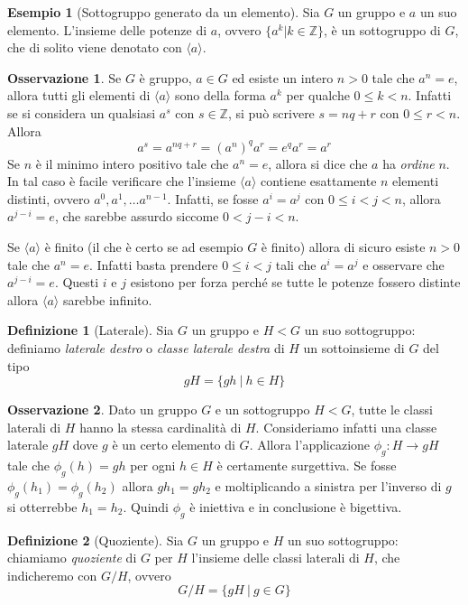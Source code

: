 \documentclass[11pt]{article}
\theoremstyle{plain}
\theoremstyle{definition}
\newtheorem{defn}{Definizione}[section]
\newtheorem{exmp}{Esempio}[section]
\newtheorem*{rem}{Osservazione}
\theoremstyle{remark}
\newcommand{\Z}{\mathbb{Z}}
\begin{document}
\begin{exmp}[Sottogruppo generato da un elemento]
Sia $G$ un gruppo e $a$ un suo elemento. L'insieme delle potenze di $a$, ovvero $\{a^k | k\in\Z\}$, è un sottogruppo di $G$,
che di solito viene denotato con $\langle a\rangle$.
\end{exmp}

\begin{rem}
Se $G$ è gruppo, $a\in G$ ed esiste un intero $n>0$ tale che $a^n=e$, allora tutti gli elementi di $\langle a\rangle$ sono della forma
$a^k$ per qualche $0\le k < n$. Infatti se si considera un qualsiasi $a^s$ con $s\in\Z$, si può scrivere $s=nq+r$ con $0\le r<n$.
Allora \[a^s=a^{nq+r} = (a^n)^qa^r = e^qa^r = a^r\]
Se $n$ è il minimo intero positivo tale che $a^n=e$, allora si dice che $a$ ha \emph{ordine} $n$. In tal caso è facile verificare che
l'insieme $\langle a\rangle$ contiene esattamente $n$ elementi distinti, ovvero $a^0, a^1, \dots a^{n-1}$.
Infatti, se fosse $a^i=a^j$ con $0\le i<j<n$, allora $a^{j-i}=e$, che sarebbe assurdo siccome $0<j-i<n$.

Se $\langle a\rangle$ è finito (il che è certo se ad esempio $G$ è finito) allora di sicuro esiste $n>0$ tale che $a^n=e$. Infatti basta prendere $0\le i < j$
tali che $a^i = a^j$ e osservare che $a^{j-i} = e$. Questi $i$ e $j$ esistono per forza perché se tutte le potenze fossero distinte allora $\langle a\rangle$ sarebbe infinito.
\end{rem}


\begin{defn}[Laterale]
	Sia $G$ un gruppo e $H<G$ un suo sottogruppo: definiamo \emph{laterale destro} o \emph{classe laterale destra} di $H$
	un sottoinsieme di $G$ del tipo
	\[gH=\{ gh\ |\ h\in H\}\]
\end{defn}

\begin{rem}
	Dato un gruppo $G$ e un sottogruppo $H<G$, tutte le classi laterali di $H$ hanno la stessa cardinalità di $H$.
	Consideriamo infatti una classe laterale $gH$ dove $g$ è un certo elemento di $G$. Allora l'applicazione $\phi_g:H\to gH$
	tale che $\phi_g(h) = gh$ per ogni $h\in H$ è certamente surgettiva. Se fosse $\phi_g(h_1) = \phi_g(h_2)$ allora $gh_1 = gh_2$ e moltiplicando
	a sinistra per l'inverso di $g$ si otterrebbe $h_1 = h_2$. Quindi $\phi_g$ è iniettiva e in conclusione è bigettiva.
\end{rem}

\begin{defn}[Quoziente]\label{defn:quoziente}
	Sia $G$ un gruppo e $H$ un suo sottogruppo: chiamiamo \emph{quoziente} di $G$ per $H$ l'insieme delle classi laterali di $H$, che indicheremo con $G/H$, ovvero
	\[G/H=\{gH\ |\ g\in G\}\]
\end{defn}
\end{document}
